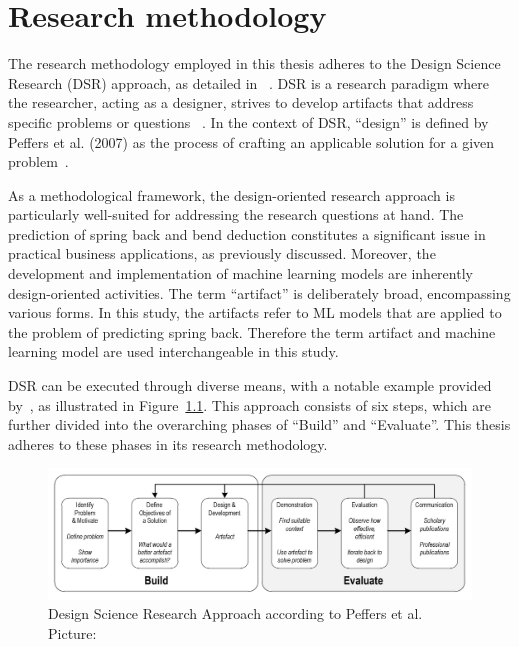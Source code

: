 \chapter{Research methodology}\label{ch:research-methodology}

The research methodology employed in this thesis adheres to the Design Science Research (DSR) approach, as detailed
in
~\cite[p. 17]{von2015management}.
DSR is a research paradigm where the researcher, acting as a designer, strives to develop artifacts that address
specific problems or questions
~\cite[p. 10]{hevner_designscienceresearch_2010}.
In the context of DSR, ``design'' is defined by Peffers et al. (2007) as the process of crafting an applicable solution
for a given problem~\cite[p. 47]{peffers2007design}.

As a methodological framework, the design-oriented research approach is particularly well-suited for addressing the
research questions at hand.
The prediction of spring back and bend deduction constitutes a significant issue in practical business applications,
as previously discussed.
Moreover, the development and implementation of machine learning models are inherently design-oriented activities.
The term ``artifact'' is deliberately broad, encompassing various forms.
In this study, the artifacts refer to \ac{ML} models that are applied to the problem of predicting spring back.
Therefore the term artifact and machine learning model are used interchangeable in this study.

DSR can be executed through diverse means, with a notable example provided by~\cite{peffers2007design},
as illustrated in Figure~\ref{fig:dsr_process}.
This approach consists of six steps, which are further divided into the overarching phases of ``Build'' and
``Evaluate''.
This thesis adheres to these phases in its research methodology.

\begin{figure}[h]
    \begin{tcolorbox}[arc=0pt,boxrule=0.5pt]
        \centering
        \includegraphics[width=1\linewidth]{chap3/images/dsr_process}
        \caption[DSR Process]{Design Science Research Approach according to Peffers et al.
        Picture:~\cite[p. 72]{sonnenberg2012evaluation}}
        \label{fig:dsr_process}
    \end{tcolorbox}
\end{figure}

